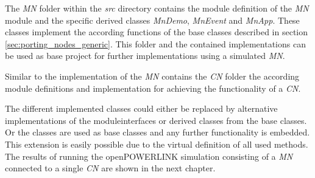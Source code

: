 The \emph{MN} folder within the \emph{src} directory contains the module definition of the \emph{MN} module and the specific derived classes \emph{MnDemo}, \emph{MnEvent} and \emph{MnApp}.
These classes implement the according functions of the base classes described in section \ref{sec:porting_nodes_generic}.
This folder and the contained implementations can be used as base project for further implementations using a simulated \emph{MN}.

Similar to the implementation of the \emph{MN} contains the \emph{CN} folder the according module definitions and implementation for achieving the functionality of a \emph{CN}.

The different implemented classes could either be replaced by alternative implementations of the moduleinterfaces or derived classes from the base classes.
Or the classes are used as base classes and any further functionality is embedded.
This extension is easily possible due to the virtual definition of all used methods.
\\

The results of running the openPOWERLINK simulation consisting of a \emph{MN} connected to a single \emph{CN} are shown in the next chapter.